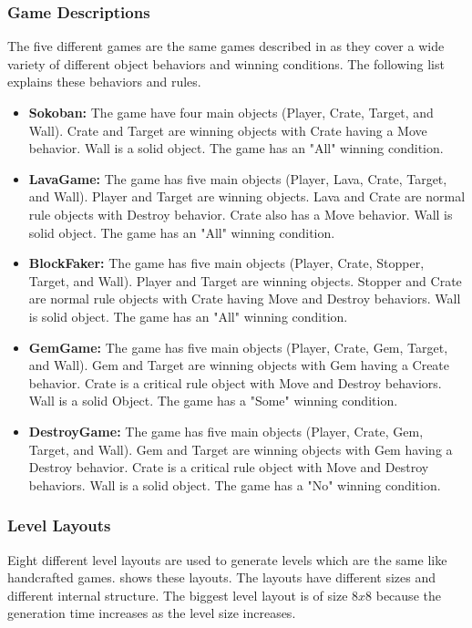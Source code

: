 \subsubsection{Game Descriptions}
The five different games are the same games described in  as they cover a wide variety of different object behaviors and winning conditions. The following list explains these behaviors and rules.
\begin{itemize}
	\item \textbf{Sokoban:} The game have four main objects (Player, Crate, Target, and Wall). Crate and Target are winning objects with Crate having a Move behavior. Wall is a solid object. The game has an "All" winning condition.
	
	\item \textbf{LavaGame:} The game has five main objects (Player, Lava, Crate, Target, and Wall). Player and Target are winning objects. Lava and Crate are normal rule objects with Destroy behavior. Crate also has a Move behavior. Wall is solid object. The game has an "All" winning condition.
	
	\item \textbf{BlockFaker:} The game has five main objects (Player, Crate, Stopper, Target, and Wall). Player and Target are winning objects. Stopper and Crate are normal rule objects with Crate having Move and Destroy behaviors. Wall is solid object. The game has an "All" winning condition.
	
	\item \textbf{GemGame:} The game has five main objects (Player, Crate, Gem, Target, and Wall). Gem and Target are winning objects with Gem having a Create behavior. Crate is a critical rule object with Move and Destroy behaviors. Wall is a solid Object. The game has a "Some" winning condition.
	
	\item \textbf{DestroyGame:} The game has five main objects (Player, Crate, Gem, Target, and Wall). Gem and Target are winning objects with Gem having a Destroy behavior. Crate is a critical rule object with Move and Destroy behaviors. Wall is a solid object. The game has a "No" winning condition.
\end{itemize}

\subsubsection{Level Layouts}
Eight different level layouts are used to generate levels which are the same like handcrafted games.  shows these layouts. The layouts have different sizes and different internal structure. The biggest level layout is of size $8x8$ because the generation time increases as the level size increases.


